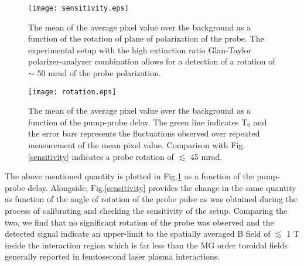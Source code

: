 \documentclass[a4paper,12pt]{article}
\begin{document}
\begin{figure}[h]
  \centering
  \begin{minipage}[b]{0.495\textwidth}
    \texttt{[image: sensitivity.eps]}
    \caption{The mean of the average pixel value over the background as a function of the rotation of plane of polarization of the probe. The experimental setup with the high extinction ratio Glan-Taylor polarizer-analyzer combination allows for a detection of a rotation of $\sim$ 50 mrad of the probe polarization.}
    \label{sensitivity}
  \end{minipage}
  \hfill
  \begin{minipage}[b]{0.495\textwidth}
    \texttt{[image: rotation.eps]}
    \caption{The mean of the average pixel value over the background as a function of the pump-probe delay. The green line indicates T$_{0}$ and the error bars represents the fluctuations observed over repeated measurement of the mean pixel value. Comparison with Fig.\ref{sensitivity} indicates a probe rotation of $\lesssim$ 45 mrad.}
    \label{rotation}
  \end{minipage}
\end{figure}

The above mentioned quantity is plotted in Fig.\ref{rotation} as a function of the pump-probe delay. Alongside, Fig.\ref{sensitivity} provides the change in the same quantity as function of the angle of rotation of the probe pulse as was obtained during the process of calibrating and checking the sensitivity of the setup. Comparing the two, we find that no significant rotation of the probe was observed and the detected signal indicate an upper-limit to the spatially averaged B field of $\lesssim$ 1 T inside the interaction region which is far less than the MG order toroidal fields generally reported in femtosecond laser plasma interactions.






\end{document}
